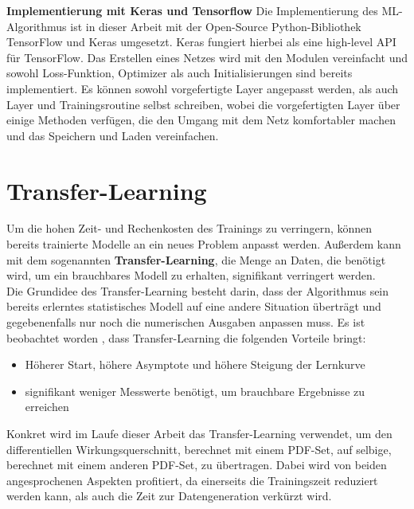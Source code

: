 \textbf{Implementierung mit Keras und Tensorflow}
Die Implementierung des ML-Algorithmus ist in dieser Arbeit mit der Open-Source Python-Bibliothek TensorFlow und Keras \cite{Keras} umgesetzt. Keras fungiert hierbei als eine high-level API für TensorFlow. Das Erstellen eines Netzes wird mit den Modulen vereinfacht und sowohl Loss-Funktion, Optimizer als auch Initialisierungen sind bereits implementiert. Es können sowohl vorgefertigte Layer angepasst werden, als auch Layer und Trainingsroutine selbst schreiben, wobei die vorgefertigten Layer über einige Methoden verfügen, die den Umgang mit dem Netz komfortabler machen und das Speichern und Laden vereinfachen. 

\section{Transfer-Learning}
\label{transfer-learning}
Um die hohen Zeit- und Rechenkosten des Trainings zu verringern, können bereits trainierte Modelle an ein neues Problem anpasst werden. Außerdem kann mit dem sogenannten \textbf{Transfer-Learning}, die Menge an Daten, die benötigt wird, um ein brauchbares Modell zu erhalten, signifikant verringert werden. \\
Die Grundidee des Transfer-Learning besteht darin, dass der Algorithmus sein bereits erlerntes statistisches Modell auf eine andere Situation überträgt und gegebenenfalls nur noch die numerischen Ausgaben anpassen muss. Es ist beobachtet worden \cite{TL}, dass Transfer-Learning die folgenden Vorteile bringt: 
\begin{itemize}
	\setlength\itemsep{0cm}
	\setlength{\parskip}{0cm}
	\item Höherer Start, höhere Asymptote und höhere Steigung der Lernkurve
	\item signifikant weniger Messwerte benötigt, um brauchbare Ergebnisse zu erreichen
\end{itemize}
Konkret wird im Laufe dieser Arbeit das Transfer-Learning verwendet, um den differentiellen Wirkungsquerschnitt, berechnet mit einem PDF-Set, auf selbige, berechnet mit einem anderen PDF-Set, zu übertragen. Dabei wird von beiden angesprochenen Aspekten profitiert, da einerseits die Trainingszeit reduziert werden kann, als auch die Zeit zur Datengeneration verkürzt wird.

